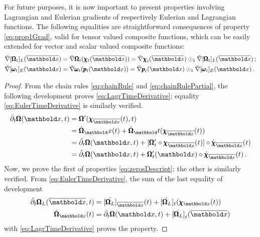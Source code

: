 For future purposes, it is now important to present properties involving Lagrangian and Eulerian gradients of respectively Eulerian and Lagrangian functions. The following equalities are straightforward consequences of property \eqref{eq:prop1Grad}, valid for tensor valued composite functions, which can be easily extended for vector and scalar valued composite functions:
\begin{equation}\label{eq:gradRelFuncs}
\begin{aligned}
\bar{\nabla}[{\tnr{\Omega}}_{t}]_L(\overline{\vto{x}})&=\bar{\nabla}{\tnr{\Omega}}_{t}(\tnr{\chi}_{t}(\overline{\vto{x}}))=\bar{\nabla}{\tnr{\chi}}_{t}(\overline{\vto{x}})\odot_1\tilde{\nabla}[{\tnr{\Omega}}_{t}]_L(\overline{\vto{x}})\,;\\
\tilde{\nabla}[{\tnr{\omega}}_{t}]_E({\vto{x}})&=\tilde{\nabla}{\tnr{\omega}}_{t}(\tnr{p}_{t}({\vto{x}}))=\tilde{\nabla}{\tnr{p}}_{t}({\vto{x}})\odot_1\bar{\nabla}[{\tnr{\omega}}_{t}]_E({\vto{x}})\,.
\end{aligned} 
\end{equation} 

{\footnotesize
\begin{proof}
From the chain rules \eqref{eq:chainRule} and \eqref{eq:chainRulePartial}, the following development proves \eqref{eq:LagrTimeDerivative}; equality \eqref{eq:EulerTimeDerivative} is similarly verified.
\begin{align*}
\bar{\partial}_t\tnr{\Omega}({\vto{x}},t)&=\tnr{\Omega}'(\fua{\tnr{\chi}_{\overline{\vto{x}}}}{t},t)\\
&=\dot{\tnr{\Omega}}_\vto{x}(t)+\dot{\tnr{\Omega}}_\vto{t}(\fua{\tnr{\chi}_{\overline{\vto{x}}}}{t}) \\
&=\tilde{\partial}_t\tnr{\Omega}({\vto{x}},t)+[\tnr{\Omega}_t'\circ\fua{\tnr{\chi}_{\overline{\vto{x}}}}{t}]\circ\fua{\dot{\tnr{\chi}}_{\overline{\vto{x}}}}{t}\\
&=\tilde{\partial}_t\tnr{\Omega}({\vto{x}},t)+\tnr{\Omega}_t'(\vto{x})\circ\fua{\dot{\tnr{\chi}}_{\overline{\vto{x}}}}{t}\,.
\end{align*}
Now, we prove the first of properties \eqref{eq:zerosDescript}; the other is similarly verified. From \eqref{eq:EulerTimeDerivative}, the sum of the last equality of development  
\begin{align*}
\tilde{\partial}_t\tnr{\Omega}_L(\overline{\vto{x}},t)&=\dot{[\tnr{\Omega}_L]}_{\overline{\vto{x}}}(t)+\dot{[\tnr{\Omega}_L}]_{t}(\tnr{\chi}_{{\vto{x}}}(t))\\
\dot{\tnr{\Omega}}_{\vto{x}}(t)&=\bar{\partial}_t\tnr{\Omega}({\vto{x}},t)+\dot{[\tnr{\Omega}_L]}_{t}(\overline{\vto{x}})
\end{align*}
with \eqref{eq:LagrTimeDerivative} proves the property.  
\end{proof}
}

